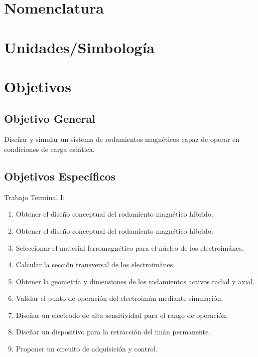 

\chapter*{Nomenclatura}
\label{sec:Acknowledgement}
\vspace*{-10mm}

\chapter*{Unidades/Simbología}
\label{sec:Acknowledgement}
\vspace*{-10mm}

\chapter*{Objetivos}
\label{sec:Acknowledgement}
\vspace*{-10mm}

\section*{Objetivo General}
Diseñar y simular un sistema de rodamientos magnéticos capaz de operar en condiciones de carga estática.

\section*{Objetivos Específicos}

{\setlength{\parindent}{0pt}Trabajo Terminal I:}
\begin{enumerate}
\addtolength{\itemsep}{0pt}
\item Obtener el diseño conceptual del rodamiento magnético híbrido.
\item Obtener el diseño conceptual del rodamiento magnético híbrido.
\item Seleccionar el material ferromagnético para el núcleo de los electroimánes. 
\item Calcular la sección transversal de los electroimánes.
\item Obtener la geometría y dimensiones de los rodamientos activos radial y axial.
\item Validar el punto de operación del electroimán mediante simulación.
\item Diseñar un electrodo de alta sensitividad para el rango de operación.
\item Diseñar un dispositivo para la retracción del imán permanente. 
\item Proponer un circuito de adquisición y control. 
\end{enumerate}

